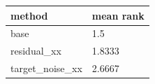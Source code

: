 \begin{tabular}{ll}
\toprule
method & mean rank \\
\midrule
base & 1.5 \\
residual\_xx & 1.8333 \\
target\_noise\_xx & 2.6667 \\
\bottomrule
\end{tabular}
